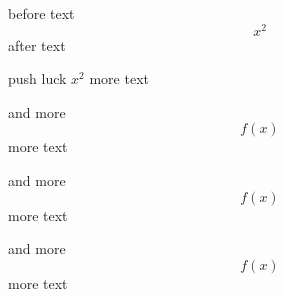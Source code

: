 before text 
\[ 
x^2 
\]
after text

push luck $x^2$ more text

and more \[ 
f(x) \] more text

and more \[ 
f(x) \] more text

and more \[ 
f(x) \] more text
